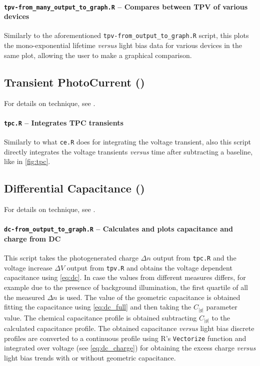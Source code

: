 		\paragraph{\texttt{tpv-\-from\_many\_output\_to\_graph.R} -- Compares between TPV of various devices}
		Similarly to the aforementioned \texttt{tpv-\-from\_output\_to\_graph.R} script, this plots the mono\hyp{}exponential lifetime \textsl{versus} light bias data for various devices in the same plot, allowing the user to make a graphical comparison.
	\subsection{Transient PhotoCurrent ()}\label{r_tpc}
		For details on  technique, see .

		\paragraph{\texttt{tpc.R} -- Integrates TPC transients}
		Similarly to what \texttt{ce.R} does for integrating the  voltage transient, also this script directly integrates the voltage transients \textsl{versus} time after subtracting a baseline, like in \cref{fig:tpc}.

	\subsection{Differential Capacitance ()}\label{r_dc}
		For details on  technique, see .

		\paragraph{\texttt{dc-\-from\_output\_to\_graph.R} -- Calculates and plots capacitance and charge from DC}
		This script takes the photogenerated charge $\Delta n$ output from \texttt{tpc.R} and the voltage increase $\Delta V$ output from \texttt{tpv.R} and obtains the voltage dependent capacitance using \cref{eq:dc}.
		In case the values from different  measures differs, for example due to the presence of background illumination, the first quartile of all the measured $\Delta n$ is used.
		The value of the geometric capacitance is obtained fitting the capacitance using \cref{eq:dc_full} and then taking the $C_|g|$ parameter value.
		The chemical capacitance profile is obtained subtracting $C_|g|$ to the calculated capacitance profile.
		The obtained capacitance \textsl{versus} light bias discrete profiles are converted to a continuous profile using R's \texttt{Vectorize} function and integrated over voltage (see \cref{eq:dc_charge}) for obtaining the excess charge \textsl{versus} light bias trends with or without geometric capacitance.

